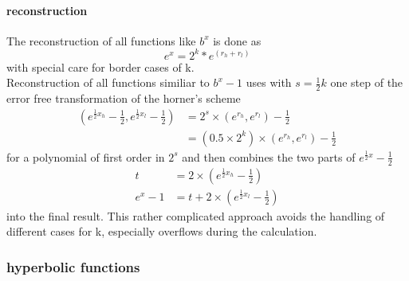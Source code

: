 \documentclass[10pt,a4paper,final,oneside]{article}
\numberwithin{equation}{subsection}
\begin{document}
\paragraph{reconstruction}
    The reconstruction of all functions like $b^x$ is done as
    \begin{equation}
        e ^ x = 2^k * e^{(r_h + r_l)}
    \end{equation}
    with special care for border cases of k.\\[10pt]
    Reconstruction of all functions similiar to $b^x-1$ uses
    with $ s  = \frac{1}{2} k $ one step of the error free
    transformation of the horner's scheme
    \begin{equation}
        \begin{aligned}
            (e^{\frac{1}{2}x_h}-\frac{1}{2}, e^{\frac{1}{2}x_l}-\frac{1}{2})
                &=
                    2^s \times (e^{r_h},e^{r_l}) - \frac{1}{2}\\
                &=
                    (0.5 \times 2^k) \times (e^{r_h},e^{r_l}) - \frac{1}{2}
        \end{aligned}
    \end{equation}
    for a polynomial of first order in $2^s$ and then combines the two parts
    of $ e^{\frac{1}{2}x} - \frac{1}{2} $
    \begin{equation}
        \begin{aligned}
        t &= 2 \times ( e^{\frac{1}{2}x_h} -\frac{1}{2} ) \\
        e ^ x -1 &= t + 2 \times (e^{\frac{1}{2}x_l} -\frac{1}{2})
        \end{aligned}
    \end{equation}
    into the final result. This rather complicated approach avoids the
    handling of different cases for k, especially overflows during the
    calculation.

\subsubsection{hyperbolic functions}
\end{document}
